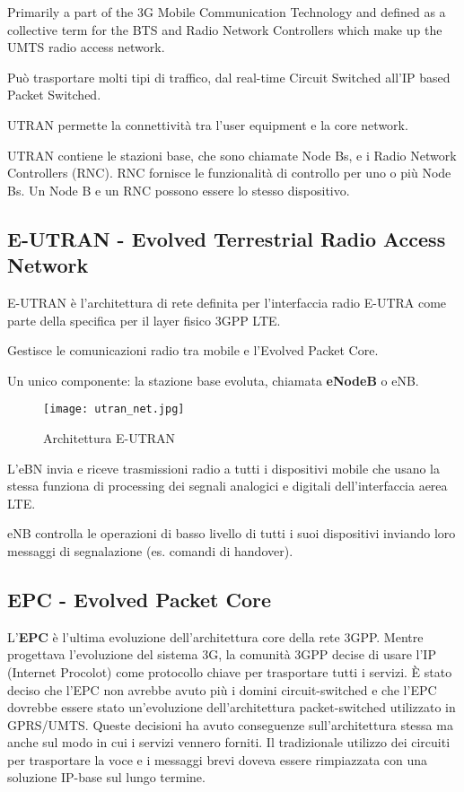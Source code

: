 Primarily a part of the 3G Mobile Communication Technology and defined as a
collective term for the BTS and Radio Network Controllers which make up the
UMTS radio access network.

Può trasportare molti tipi di traffico, dal real-time Circuit Switched all'IP 
based Packet Switched.

UTRAN permette la connettività tra l'user equipment e la core network.

UTRAN contiene le stazioni base, che sono chiamate Node Bs, e i Radio
Network Controllers (RNC).
RNC fornisce le funzionalità di controllo per uno o più Node Bs.
Un Node B e un RNC possono essere lo stesso dispositivo.

\subsection{E-UTRAN - Evolved Terrestrial Radio Access Network}

E-UTRAN è l'architettura di rete definita per l'interfaccia radio E-UTRA 
come parte della specifica per il layer fisico 3GPP LTE.

Gestisce le comunicazioni radio tra mobile e l'Evolved Packet Core.

Un unico componente: la stazione base evoluta, chiamata \textbf{eNodeB} o eNB.

\begin{figure}[H]
  \centering
  \texttt{[image: utran\_net.jpg]}
  \caption{Architettura E-UTRAN}
  \label{fig:utran_net}
\end{figure}

L'eBN invia e riceve trasmissioni radio a tutti i dispositivi mobile che usano la 
stessa funziona di processing dei segnali analogici e digitali dell'interfaccia aerea LTE.

eNB controlla le operazioni di basso livello di tutti i suoi dispositivi inviando loro
messaggi di segnalazione (es. comandi di handover).


\subsection{EPC - Evolved Packet Core}

L'\textbf{EPC} è l'ultima evoluzione dell'architettura core della rete 3GPP.
Mentre progettava l'evoluzione del sistema 3G, la comunità 3GPP decise di usare 
l'IP (Internet Procolot) come protocollo chiave per trasportare tutti i servizi.
È stato deciso che l'EPC non avrebbe avuto più i domini circuit-switched e che l'EPC 
dovrebbe essere stato un'evoluzione dell'architettura packet-switched utilizzato 
in GPRS/UMTS.
Queste decisioni ha avuto conseguenze sull'architettura stessa ma anche sul modo in
cui i servizi vennero forniti.
Il tradizionale utilizzo dei circuiti per trasportare la voce e i messaggi brevi 
doveva essere rimpiazzata con una soluzione IP-base sul lungo termine.

